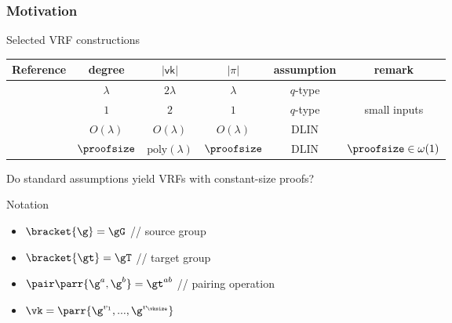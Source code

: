 \begin{frame}
    \frametitle{Motivation}
    \begin{block}{Selected VRF constructions}
        \begin{tabular}{l|c|c|c|c|c}
            \small
            Reference & degree & \(|\mathsf{vk}|\) & \(|\pi|\) & assumption & remark \\
            \hline
            \cite{C:Lysyanskaya02} & \(\lambda\) & \(2\lambda\) & \(\lambda\) & \(q\)-type & \\
            \cite{PKC:DodYam05} & \(1\) & \(2\) & \(1\) & \(q\)-type & small inputs \\
            \cite{TCC:HofJag16} & \(O(\lambda)\) & \(O(\lambda)\) & \(O(\lambda)\) & DLIN & \\
            \cite{PKC:Kohl19} & \(\proofsize\) & \(\mathrm{poly}(\lambda)\) & \(\proofsize\) & DLIN & \(\proofsize\in\omega(1)\) \\
          \end{tabular}
    \end{block}
    \pause
    \begin{mdframed}[backgroundcolor=black!10]
        Do standard assumptions yield VRFs with constant-size proofs?
    \end{mdframed}
    \pause
    \begin{block}{Notation}
        \begin{itemize}
            \item \(\bracket{\g} = \gG\) \hfill // source group
            \item \(\bracket{\gt} = \gT\) \hfill// target group
            \item \(\pair\parr{\g^a,\g^b} = \gt^{ab}\) \hfill// pairing operation
            \item \(\vk = \parr{\g^{v_1}, ..., \g^{v_\vksize}}\)
        \end{itemize}
    \end{block}
\end{frame}

